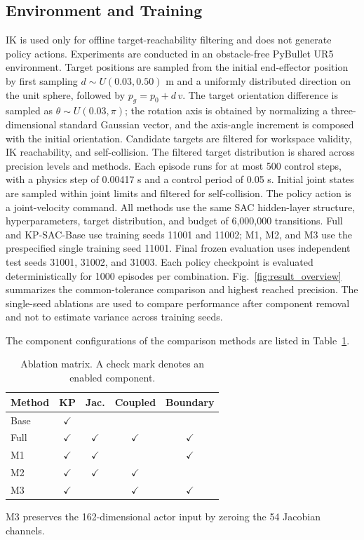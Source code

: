 \documentclass[conference]{IEEEtran}
\begin{document}
\subsection{Environment and Training}
IK is used only for offline target-reachability filtering and does not generate policy actions. Experiments are conducted in an obstacle-free PyBullet UR5 environment. Target positions are sampled from the initial end-effector position by first sampling $d\sim U(0.03,0.50)$ m and a uniformly distributed direction on the unit sphere, followed by $p_g=p_0+d\,v$. The target orientation difference is sampled as $\theta\sim U(0.03,\pi)$; the rotation axis is obtained by normalizing a three-dimensional standard Gaussian vector, and the axis-angle increment is composed with the initial orientation. Candidate targets are filtered for workspace validity, IK reachability, and self-collision. The filtered target distribution is shared across precision levels and methods. Each episode runs for at most 500 control steps, with a physics step of 0.00417 s and a control period of 0.05 s. Initial joint states are sampled within joint limits and filtered for self-collision. The policy action is a joint-velocity command. All methods use the same SAC hidden-layer structure, hyperparameters, target distribution, and budget of 6,000,000 transitions. Full and KP-SAC-Base use training seeds 11001 and 11002; M1, M2, and M3 use the prespecified single training seed 11001. Final frozen evaluation uses independent test seeds 31001, 31002, and 31003. Each policy checkpoint is evaluated deterministically for 1000 episodes per combination. Fig.~\ref{fig:result_overview} summarizes the common-tolerance comparison and highest reached precision. The single-seed ablations are used to compare performance after component removal and not to estimate variance across training seeds.

The component configurations of the comparison methods are listed in Table~\ref{tab:methods}.
\begin{table}[htbp]
\caption{Ablation matrix. A check mark denotes an enabled component.}
\label{tab:methods}
\centering
\begin{tabular}{l|cccc}
\hline
Method & KP & Jac. & Coupled & Boundary\\
\hline
Base & $\checkmark$ &  &  &  \\
Full & $\checkmark$ & $\checkmark$ & $\checkmark$ & $\checkmark$\\
M1 & $\checkmark$ & $\checkmark$ &  & $\checkmark$\\
M2 & $\checkmark$ & $\checkmark$ & $\checkmark$ &  \\
M3 & $\checkmark$ &  & $\checkmark$ & $\checkmark$\\
\hline
\end{tabular}
\end{table}
M3 preserves the 162-dimensional actor input by zeroing the 54 Jacobian channels.
\end{document}
